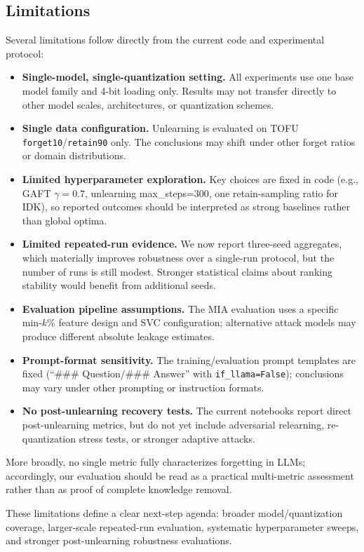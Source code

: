 \documentclass[conference]{IEEEtran}
\begin{document}
\subsection{Limitations}
Several limitations follow directly from the current code and experimental protocol:
\begin{itemize}
\item \textbf{Single-model, single-quantization setting.} All experiments use one base model family and 4-bit loading only. Results may not transfer directly to other model scales, architectures, or quantization schemes.
\item \textbf{Single data configuration.} Unlearning is evaluated on TOFU \texttt{forget10}/\texttt{retain90} only. The conclusions may shift under other forget ratios or domain distributions.
\item \textbf{Limited hyperparameter exploration.} Key choices are fixed in code (e.g., GAFT $\gamma=0.7$, unlearning max\_steps=300, one retain-sampling ratio for IDK), so reported outcomes should be interpreted as strong baselines rather than global optima.
\item \textbf{Limited repeated-run evidence.} We now report three-seed aggregates, which materially improves robustness over a single-run protocol, but the number of runs is still modest. Stronger statistical claims about ranking stability would benefit from additional seeds.
\item \textbf{Evaluation pipeline assumptions.} The MIA evaluation uses a specific min-$k$\% feature design and SVC configuration; alternative attack models may produce different absolute leakage estimates.
\item \textbf{Prompt-format sensitivity.} The training/evaluation prompt templates are fixed (``\#\#\# Question/\#\#\# Answer'' with \texttt{if\_llama=False}); conclusions may vary under other prompting or instruction formats.
\item \textbf{No post-unlearning recovery tests.} The current notebooks report direct post-unlearning metrics, but do not yet include adversarial relearning, re-quantization stress tests, or stronger adaptive attacks.
\end{itemize}

More broadly, no single metric fully characterizes forgetting in LLMs; accordingly, our evaluation should be read as a practical multi-metric assessment rather than as proof of complete knowledge removal.

These limitations define a clear next-step agenda: broader model/quantization coverage, larger-scale repeated-run evaluation, systematic hyperparameter sweeps, and stronger post-unlearning robustness evaluations.
\end{document}
